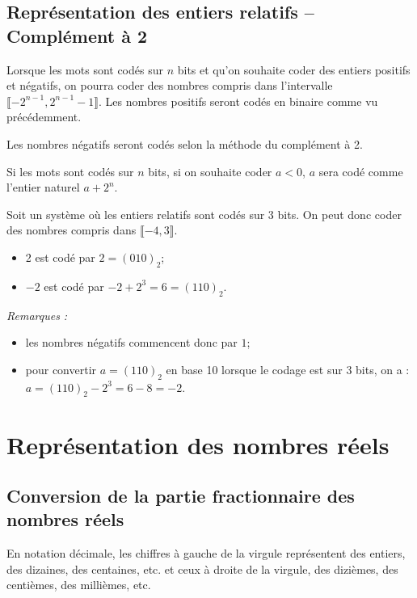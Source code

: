 \subsection{Représentation des entiers relatifs -- Complément à 2}

Lorsque les mots sont codés sur $n$ bits et qu'on souhaite coder des entiers positifs et négatifs, on pourra coder des nombres compris dans l'intervalle $\llbracket-2^{n-1},2^{n-1}-1\rrbracket$. Les nombres positifs seront codés en binaire comme vu précédemment. 

Les nombres négatifs seront codés selon la méthode du complément à 2. 
\begin{methode}
Si les mots sont codés sur $n$ bits, si on souhaite coder $a<0$, $a$ sera codé comme l'entier naturel $a+2^n$. 
\end{methode}

\begin{exemple} 
\begin{multicols}{2}
Soit un système où les entiers relatifs sont codés sur 3 bits. On peut donc coder des nombres compris dans $\llbracket-4,3\rrbracket$.
\begin{itemize}
\item 2 est codé par $2=(010)_2$;
\item $-2$ est codé par $-2+2^3 = 6 = (110)_2$.
\end{itemize}  
\textit{Remarques :}
\begin{itemize}
\item les nombres négatifs commencent donc par $1$;
\item pour convertir $a=(110)_2$ en base 10 lorsque le codage est sur 3 bits, on a :$a= (110)_2 - 2^3 = 6 - 8 = -2$.
\end{itemize}  
\end{multicols}
\end{exemple}

\section{Représentation des nombres réels}
\subsection{Conversion de la partie fractionnaire des nombres réels}

En notation décimale, les chiffres à gauche de la virgule représentent des entiers, des dizaines, des centaines, etc. et ceux à droite de la virgule, des dizièmes, des centièmes, des millièmes, etc.


